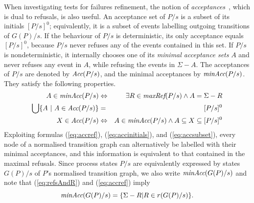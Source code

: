 When investigating  tests for failures refinement, the notion of
\emph{acceptances}~\cite{Hennessy:1988:ATP:50497}, which is dual to refusals,
is also useful. An acceptance set of $P/s$ is a subset of its initials
$[P/s]^0$; equivalently, it is a subset of events labelling  outgoing transitions of
$G(P)/s$. If the behaviour of  $P/s$ is deterministic, its only acceptance
equals $[P/s]^0$, because $P/s$ never refuses any of the events contained in
this set. If $P/s$ is nondeterministic, it internally chooses one of its
\emph{minimal acceptance sets} $A$ and never refuses any event in $A$, while
refusing the events in $\Sigma-A$. The acceptances of $P/s$ are denoted by
$\text{\it Acc}(P/s)$, and the minimal acceptances by $\text{\it minAcc}(P/s)$. They satisfy
the following properties.
%
\begin{eqnarray}
A\in \text{\it minAcc}(P/s) & \Leftrightarrow & \exists R\in\text{\it maxRef}(P/s) \wedge A = \Sigma-R
\label{eq:accref}
\\
\bigcup \{ A~|~A\in \text{\it Acc}(P/s)\} & = & [P/s]^0
\label{eq:accinitials}
\\
 X\in\text{\it Acc}(P/s) &\Leftrightarrow & A\in \text{\it minAcc}(P/s) \wedge A\subseteq X \subseteq [P/s]^0
 \label{eq:accsubset}
\end{eqnarray}
%
%
Exploiting formulas (\ref{eq:accref}), (\ref{eq:accinitials}), and
(\ref{eq:accsubset}), every node of a normalised transition graph can
alternatively be labelled with their minimal acceptances, and this
information is equivalent to that contained in the maximal refusals. Since
process states $P/s$ are equivalently expressed by states $G(P)/s$ of $P$'s
normalised transition graph, we also write $\text{\it minAcc}(G(P)/s)$ and
note that (\ref{eq:refsAndR}) and (\ref{eq:accref}) imply 
\begin{equation}\label{eq:maxrefsminaccs}
\text{\it minAcc}(G(P)/s) = \{ \Sigma - R | R\in r(G(P)/s) \}.
\end{equation}

 

